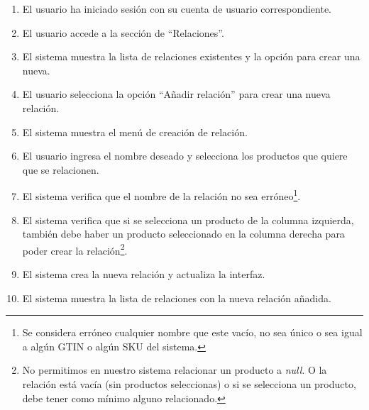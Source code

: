 \begin{enumerate}
    \item El usuario ha iniciado sesión con su cuenta de usuario correspondiente.
    \item El usuario accede a la sección de \enquote{Relaciones}.
    \item El sistema muestra la lista de relaciones existentes y la opción para crear una nueva.
    \item El usuario selecciona la opción \enquote{Añadir relación} para crear una nueva relación.
    \item El sistema muestra el menú de creación de relación.
    \item El usuario ingresa el nombre deseado y selecciona los productos que quiere que se relacionen.
    \item El sistema verifica que el nombre de la relación no sea erróneo\footnote{Se considera erróneo cualquier nombre que este vacío, no sea único o sea igual a algún GTIN o algún SKU del sistema.}.
    \item El sistema verifica que si se selecciona un producto de la columna izquierda, también debe haber un producto seleccionado en la columna derecha para poder crear la relación\footnote{No permitimos en nuestro sistema relacionar un producto a \emph{null}. O la relación está vacía (sin productos seleccionas) o si se selecciona un producto, debe tener como mínimo alguno relacionado.}.
    \item El sistema crea la nueva relación y actualiza la interfaz.
    \item El sistema muestra la lista de relaciones con la nueva relación añadida.
\end{enumerate}

